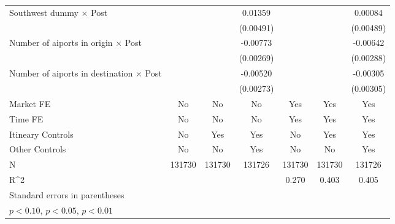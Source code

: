 \begin{table}[htbp]
\begin{tabular}{l*{6}{c}}
\addlinespace
Southwest dummy $\times$ Post&                     &                     &     0.01359\sym{***}&                     &                     &     0.00084         \\
                    &                     &                     &   (0.00491)         &                     &                     &   (0.00489)         \\
\addlinespace
Number of aiports in origin $\times$ Post&                     &                     &    -0.00773\sym{***}&                     &                     &    -0.00642\sym{**} \\
                    &                     &                     &   (0.00269)         &                     &                     &   (0.00288)         \\
\addlinespace
Number of aiports in destination $\times$ Post&                     &                     &    -0.00520\sym{*}  &                     &                     &    -0.00305         \\
                    &                     &                     &   (0.00273)         &                     &                     &   (0.00305)         \\
\midrule
Market FE           &          No         &          No         &          No         &         Yes         &         Yes         &         Yes         \\
Time FE             &          No         &          No         &          No         &         Yes         &         Yes         &         Yes         \\
Itineary Controls   &          No         &         Yes         &         Yes         &          No         &         Yes         &         Yes         \\
Other Controls      &          No         &          No         &         Yes         &          No         &          No         &         Yes         \\
N                   &      131730         &      131730         &      131726         &      131730         &      131730         &      131726         \\
R^2                 &                     &                     &                     &       0.270         &       0.403         &       0.405         \\
\bottomrule
\multicolumn{7}{l}{\footnotesize Standard errors in parentheses}\\
\multicolumn{7}{l}{\footnotesize \sym{*} \(p<0.10\), \sym{**} \(p<0.05\), \sym{***} \(p<0.01\)}\\
\end{tabular}
\end{table}
